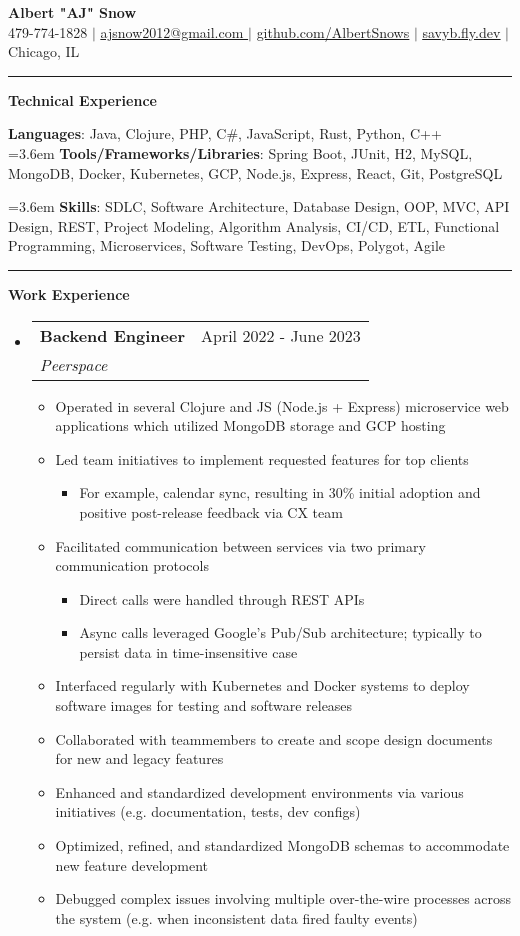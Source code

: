 \documentclass[letterpaper,11pt]{article}
\makeatletter
\newcommand{\resumeItem}[1]{
  \item\small{
    {#1 \vspace{-2pt}}
  }
}
\newcommand{\resumeSubheading}[4]{
  \vspace{-2pt}\item
    \begin{tabular*}{0.97\textwidth}[t]{l@{\extracolsep{\fill}}r}
      \textbf{#1} & #2 \\
      \textit{\small#3} & \textit{\small #4} \\
    \end{tabular*}\vspace{0pt}
}
\newcommand{\resumeSubHeadingListStart}{\begin{itemize}[leftmargin=0.15cm, label={}]}
\newcommand{\resumeSubHeadingListEnd}{\end{itemize}}
\newcommand{\resumeItemListStart}{\begin{itemize}}
\newcommand{\resumeItemListEnd}{\end{itemize}\vspace{-5pt}}
\makeatother
\begin{document}
\textbf{\normalshape \Large \textcolor{magic_blue}{Albert "AJ" Snow}} \\ \vspace{3pt}
\small 479-774-1828 $|$ 
\href{ mailto:ajsnow2012@gmail.com }
{\underline{ ajsnow2012@gmail.com }} $|$
\href{https://github.com/AlbertSnows}{\underline{github.com/AlbertSnows}}
$|$ \href{https://savyb.fly.dev/}{\underline{savyb.fly.dev}}
$|$ Chicago, IL
\noindent\rule{19.5cm}{0.4pt}

\textbf{\large \textcolor{magic_blue}{Technical Experience} }

\begin{onehalfspace}
	\textbf{ Languages}{: Java, Clojure, PHP, C\#, JavaScript, Rust, Python, C++ } \\
	\hangindent=3.6em
	\textbf{ Tools/Frameworks/Libraries}{:
		Spring Boot, JUnit, H2, MySQL,
		MongoDB, Docker, Kubernetes, GCP, Node.js,
		Express, React, Git, PostgreSQL } \\
\end{onehalfspace}

\hangindent=3.6em
\textbf{ Skills}{: }
SDLC, Software Architecture, Database Design, OOP, MVC, API Design,
REST,  Project Modeling,
Algorithm Analysis, CI/CD,
ETL, Functional Programming, Microservices,
Software Testing, DevOps, Polygot, Agile

\noindent\rule{19.5cm}{0.4pt}

\textbf{\large \textcolor{magic_blue}{Work Experience}}
\resumeSubHeadingListStart
\resumeSubheading
{Backend Engineer}{ April 2022 - June 2023}
{Peerspace}{}
\resumeItemListStart
\resumeItem{ Operated in several Clojure and JS (Node.js + Express) microservice web applications which utilized MongoDB storage and GCP hosting}
\resumeItem{ Led team initiatives to implement requested features for top clients }
\begin{itemize}
	\item For example, calendar sync, resulting in 30\% initial adoption and positive post-release feedback via CX team
\end{itemize}
\resumeItem{Facilitated communication between services via two primary communication protocols}
\begin{itemize}
	\item Direct calls were handled through REST APIs
	\item Async calls leveraged Google's Pub/Sub architecture; typically to persist data in time-insensitive case
\end{itemize}
\resumeItem{Interfaced regularly with Kubernetes and Docker systems to deploy software images for testing and software releases}
\resumeItem{Collaborated with teammembers to create and scope design documents for new and legacy features}
\resumeItem{Enhanced and standardized development environments via various initiatives (e.g. documentation, tests, dev configs)}
\resumeItem{Optimized, refined, and standardized MongoDB schemas to accommodate new feature development}
\resumeItem{Debugged complex issues involving multiple over-the-wire processes across the system (e.g. when inconsistent data fired faulty events) }
\resumeItemListEnd
\resumeSubHeadingListEnd
\end{document}
